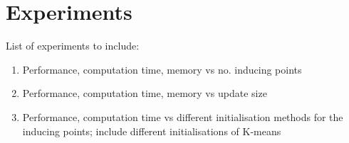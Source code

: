 \section{Experiments}\label{sec:expts}

List of experiments to include:
\begin{enumerate}
\item Performance, computation time, memory vs no. inducing points
\item Performance, computation time, memory vs update size
\item Performance, computation time vs different initialisation methods for the inducing points; include different initialisations of K-means
\end{enumerate}